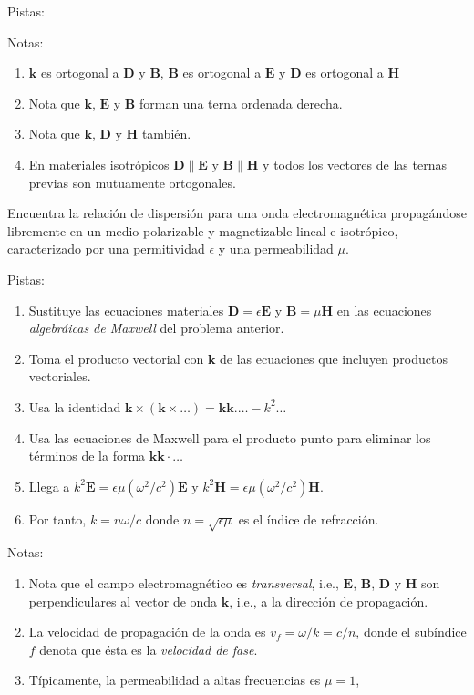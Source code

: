 \documentclass{exam}
\newenvironment{pistas}{\par\noindent Pistas:\begin{enumerate}} {\end{enumerate}}
\newenvironment{notas}{\par\noindent Notas:\begin{enumerate}} {\end{enumerate}}
\begin{document}
\begin{questions}
\begin{pistas}
  \end{pistas}
  \begin{notas}
  \item $\bm k$ es ortogonal a $\bm D$ y $\bm B$, $\bm B$ es ortogonal
    a $\bm E$ y $\bm D$ es ortogonal a $\bm H$
  \item Nota que $\bm k$, $\bm E$ y $\bm B$ forman una terna ordenada
    derecha.
  \item Nota que $\bm k$, $\bm D$ y $\bm H$ también.
  \item En materiales isotrópicos $\bm D\|\bm E$ y $\bm B\|\bm H$ y
    todos los vectores de las ternas previas son mutuamente ortogonales.
  \end{notas}
\question\label{d} Encuentra la relación de dispersión para una onda
  electromagnética propagándose libremente en un medio polarizable y magnetizable
  lineal e isotrópico, caracterizado por una permitividad
 $\epsilon$ y una permeabilidad $\mu$.
 \begin{pistas}
     \item Sustituye las ecuaciones materiales $\bm D=\epsilon\bm E$ y
       $\bm B=\mu \bm H$ en las ecuaciones {\em algebráicas de Maxwell} del
       problema anterior.
     \item Toma el producto vectorial con $\bm k$ de las ecuaciones
       que incluyen productos vectoriales.
     \item Usa la identidad $\bm k\times(\bm k\times\ldots)=\bm k\bm
       k.\ldots-k^2\ldots$
     \item Usa las ecuaciones de Maxwell para el producto punto para
       eliminar los términos de la forma $\bm k\bm k\cdot\ldots$
     \item Llega a $k^2\bm E=\epsilon\mu(\omega^2/c^2)\bm E$ y  $k^2\bm
       H=\epsilon\mu(\omega^2/c^2)\bm H$.
     \item Por tanto, $k=n\omega/c$ donde $n=\sqrt{\epsilon\mu}$ es el
       índice de refracción.
 \end{pistas}
 \begin{notas}
 \item Nota que el campo electromagnético es {\em transversal}, i.e.,
   $\bm E$, $\bm B$, $\bm D$ y $\bm H$ son perpendiculares al vector
   de onda $\bm k$, i.e., a la dirección
   de propagación.
 \item La velocidad de propagación de la onda es
   $v_f=\omega/k=c/n$, donde el subíndice $f$ denota que ésta es la
   {\em velocidad de fase}.
 \item Típicamente, la permeabilidad a altas frecuencias es $\mu=1$,

\end{notas}
\end{questions}
\end{document}
